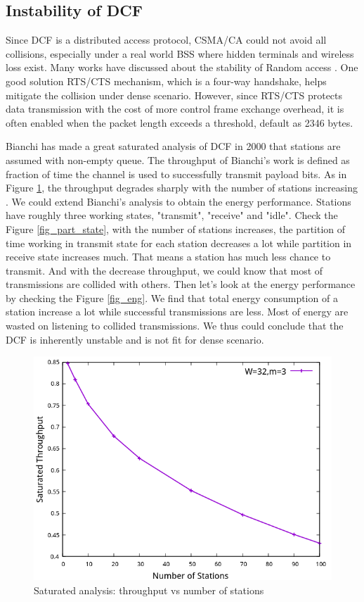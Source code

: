 \subsection*{Instability of DCF}
Since DCF is a distributed access protocol, CSMA/CA could not avoid all collisions, especially under a real world BSS where hidden terminals and wireless loss exist.
Many works have discussed about the stability of Random access \cite{szpankowski1983packet}. 
One good solution RTS/CTS mechanism, which is a four-way handshake, helps mitigate the collision under dense scenario. 
However, since RTS/CTS protects data transmission with the cost of more control frame exchange overhead, it is often enabled when the packet length exceeds a threshold, default as 2346 bytes.

Bianchi has made a great saturated analysis of DCF in 2000 that stations are assumed with non-empty queue. 
The throughput of Bianchi's work is defined as fraction of time the channel is used to successfully transmit payload bits.
As in Figure \ref{fig_thp_legacy}, the throughput degrades sharply with the number of stations increasing .
We could extend Bianchi's analysis to obtain the energy performance.
Stations have roughly three working states, "transmit", "receive" and "idle".
Check the Figure \ref{fig_part_state}, with the number of stations increases, the partition of time working in transmit state for each station decreases a lot while partition in receive state increases much. 
That means a station has much less chance to transmit. And with the decrease throughput, we could know that most of transmissions are collided with others. 
Then let's look at the energy performance by checking the Figure \ref{fig_eng}. 
We find that total energy consumption of a station increase a lot while successful transmissions are less.
Most of energy are wasted on listening to collided transmissions.
We thus could conclude that the DCF is inherently unstable and is not fit for dense scenario.


\begin{figure}[!h]
\centering
\includegraphics[scale=0.85]{./figure/chp1/n_throughput.png}
\caption{Saturated analysis: throughput vs number of stations}
\label{fig_thp_legacy}
\end{figure}
\vspace*{0.5cm}

